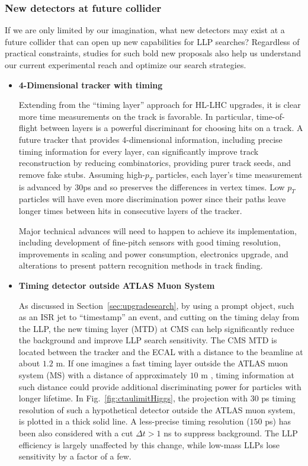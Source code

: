 \subsubsection{New detectors at future collider}

If we are only limited by our imagination, what new detectors may exist at a future collider that can open up new capabilities for LLP searches? 
Regardless of practical constraints, studies for such bold new proposals also help us understand our current experimental reach and optimize our search strategies. 

\begin{itemize}
\item \textbf{4-Dimensional tracker with timing} 

Extending from the “timing layer” approach for HL-LHC upgrades, it is clear more time measurements on the track is favorable. 
In particular, time-of-flight between layers is a powerful discriminant for choosing hits on a track.
A future tracker that provides 4-dimensional information, including precise timing information for every layer, can significantly improve track reconstruction by reducing combinatorics, providing purer track seeds, and remove fake stubs. 
Assuming high-$p_T$ particles, each layer's time measurement is advanced by 30ps and so preserves the differences in vertex times.
Low $p_T$ particles will have even more discrimination power since their paths leave longer times between hits in consecutive layers of the tracker. 

Major technical advances will need to happen to achieve its implementation, including development of fine-pitch sensors with good timing resolution, improvements in scaling and power consumption, electronics upgrade, and alterations to present pattern recognition methods in track finding. 

\item \textbf{Timing detector outside ATLAS Muon System}

As discussed in Section~\ref{sec:upgradesearch}, by using a prompt object, such as an ISR jet to ``timestamp'' an event, and cutting on the timing delay from the LLP, the new timing layer (MTD) at CMS can help significantly reduce the background and improve LLP search sensitivity. 
The CMS MTD is located between the tracker and the ECAL with a distance to the beamline at about $1.2\,\,\mathrm{m}$. 
If one imagines a fast timing layer outside the ATLAS muon system (MS) with a distance of approximately $10\,\,\mathrm{m}$ \cite{Liu:2018wte}, timing information at such distance could provide additional discriminating power for particles with longer lifetime. 
In Fig.~\ref{fig:ctaulimitHiggs}, the projection with $30$ ps timing resolution of such a hypothetical detector outside the ATLAS muon system, is plotted in a thick solid line. 
A less-precise timing resolution 
($150$ ps) has been also considered with a cut $\Delta t > 1$ ns to suppress background.
The LLP efficiency is largely unaffected by this change, while low-mass LLPs lose sensitivity by a factor of a few.


\end{itemize}
